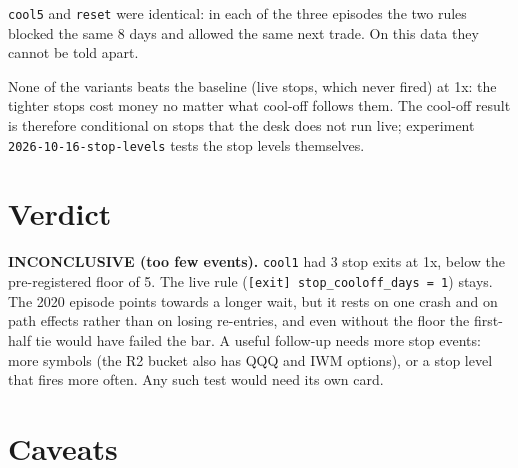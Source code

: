\documentclass{article}
\begin{document}
\texttt{cool5} and \texttt{reset} were identical: in each of the three episodes the two rules blocked the same 8 days and allowed the same next trade. On this data they cannot be told apart.

None of the variants beats the baseline (live stops, which never fired) at 1x: the tighter stops cost money no matter what cool-off follows them. The cool-off result is therefore conditional on stops that the desk does not run live; experiment \texttt{2026-\allowbreak{}10-\allowbreak{}16-\allowbreak{}stop-\allowbreak{}levels} tests the stop levels themselves.

\section{Verdict}

\textbf{INCONCLUSIVE (too few events).} \texttt{cool1} had 3 stop exits at 1x, below the pre-registered floor of 5. The live rule (\texttt{[exit] stop\_\allowbreak{}cooloff\_\allowbreak{}days = 1}) stays. The 2020 episode points towards a longer wait, but it rests on one crash and on path effects rather than on losing re-entries, and even without the floor the first-half tie would have failed the bar. A useful follow-up needs more stop events: more symbols (the R2 bucket also has QQQ and IWM options), or a stop level that fires more often. Any such test would need its own card.

\section{Caveats}
\end{document}
